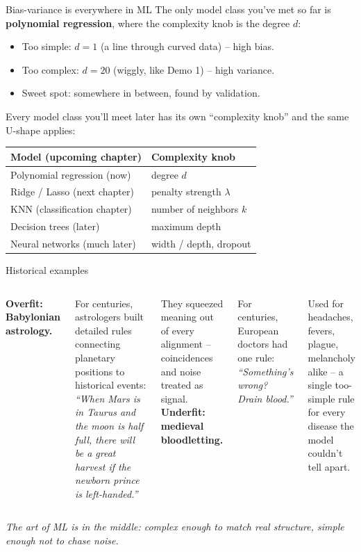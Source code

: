 \documentclass[aspectratio=169]{beamer}
\begin{document}
\begin{frame}{Bias-variance is everywhere in ML}
  The only model class you've met so far is \textbf{polynomial regression}, where the complexity knob is the degree $d$:
  \begin{itemize}\small
    \item Too simple: $d = 1$ (a line through curved data) -- high bias.
    \item Too complex: $d = 20$ (wiggly, like Demo 1) -- high variance.
    \item Sweet spot: somewhere in between, found by validation.
  \end{itemize}
  \vfill
  Every model class you'll meet later has its own ``complexity knob'' and the same U-shape applies:
  \vskip 4pt
  \begin{center}\small
  \begin{tabular}{ll}
    \textbf{Model (upcoming chapter)} & \textbf{Complexity knob} \\
    \hline
    Polynomial regression (now) & degree $d$ \\
    Ridge / Lasso (next chapter) & penalty strength $\lambda$ \\
    KNN (classification chapter) & number of neighbors $k$ \\
    Decision trees (later) & maximum depth \\
    Neural networks (much later) & width / depth, dropout \\
    \hline
  \end{tabular}
  \end{center}
  \vfill
\end{frame}

\begin{frame}{Historical examples}
  \begin{columns}[T]
    \textbf{Overfit: Babylonian astrology.}

    For centuries, astrologers built detailed rules connecting planetary positions to historical events:
    \emph{``When Mars is in Taurus and the moon is half full, there will be a great harvest if the newborn prince is left-handed.''}

    They squeezed meaning out of every alignment -- coincidences and noise treated as signal.
    \textbf{Underfit: medieval bloodletting.}

    For centuries, European doctors had one rule:
    \emph{``Something's wrong? Drain blood.''}

    Used for headaches, fevers, plague, melancholy alike -- a single too-simple rule for every disease the model couldn't tell apart.
  \end{columns}
  \vfill
  \emph{The art of ML is in the middle: complex enough to match real structure, simple enough not to chase noise.}
\end{frame}
\end{document}

